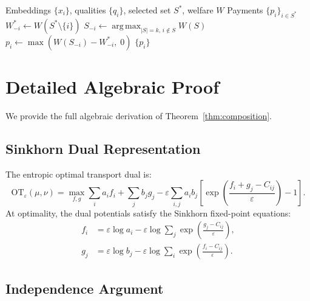 \documentclass[10pt]{article}
\DeclareMathOperator*{\argmax}{arg\,max}
\begin{document}
\begin{algorithm}[H]
\caption{VCG Payments for Diverse Selection}
\label{alg:vcg}
\begin{algorithmic}[1]
\REQUIRE Embeddings $\{x_i\}$, qualities $\{q_i\}$, selected set $S^*$, welfare $W$
\ENSURE Payments $\{p_i\}_{i \in S^*}$
  \STATE $W_{-i}^* \leftarrow W(S^* \setminus \{i\})$ 
  \STATE $S_{-i} \leftarrow \argmax_{|S|=k,\, i \notin S} W(S)$ 
  \STATE $p_i \leftarrow \max(W(S_{-i}) - W_{-i}^*,\; 0)$ 
\ENDFOR
\RETURN $\{p_i\}$
\end{algorithmic}
\end{algorithm}

\section{Detailed Algebraic Proof}
\label{app:proof}

We provide the full algebraic derivation of Theorem~\ref{thm:composition}.

\subsection{Sinkhorn Dual Representation}

The entropic optimal transport dual is:
\[
\mathrm{OT}_\varepsilon(\mu, \nu) = \max_{f, g} \sum_i a_i f_i + \sum_j b_j g_j - \varepsilon \sum_{i,j} a_i b_j \left[\exp\!\left(\frac{f_i + g_j - C_{ij}}{\varepsilon}\right) - 1\right].
\]
At optimality, the dual potentials satisfy the Sinkhorn fixed-point equations:
\begin{align}
f_i &= \varepsilon \log a_i - \varepsilon \log \sum_j \exp\!\left(\frac{g_j - C_{ij}}{\varepsilon}\right), \\
g_j &= \varepsilon \log b_j - \varepsilon \log \sum_i \exp\!\left(\frac{f_i - C_{ij}}{\varepsilon}\right).
\end{align}

\subsection{Independence Argument}
\end{document}

